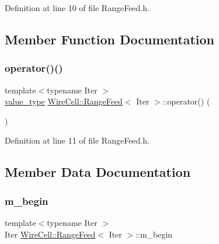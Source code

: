 Definition at line 10 of file Range\+Feed.\+h.



\subsection{Member Function Documentation}
\mbox{\label{struct_wire_cell_1_1_range_feed_a19e1689a39c3f35ae9c121997174bdc4}} 
\subsubsection{\texorpdfstring{operator()()}{operator()()}}
{\footnotesize\ttfamily template$<$typename Iter $>$ \\
\hyperlink{struct_wire_cell_1_1_range_feed_a32b94891e47c23ea05844c6bd6d0ace7}{value\+\_\+type} \hyperlink{struct_wire_cell_1_1_range_feed}{Wire\+Cell\+::\+Range\+Feed}$<$ Iter $>$\+::operator() (\begin{DoxyParamCaption}{ }\end{DoxyParamCaption})\hspace{0.3cm}{\ttfamily [inline]}}



Definition at line 11 of file Range\+Feed.\+h.



\subsection{Member Data Documentation}
\mbox{\label{struct_wire_cell_1_1_range_feed_a82e91c21a7ee9836f1601c8c4866edae}} 
\subsubsection{\texorpdfstring{m\+\_\+begin}{m\_begin}}
{\footnotesize\ttfamily template$<$typename Iter $>$ \\
Iter \hyperlink{struct_wire_cell_1_1_range_feed}{Wire\+Cell\+::\+Range\+Feed}$<$ Iter $>$\+::m\+\_\+begin}



